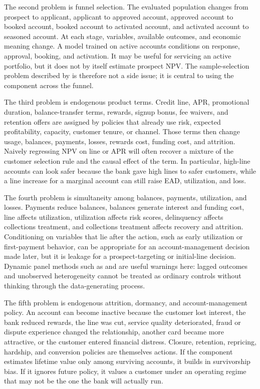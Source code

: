 \documentclass[11pt]{article}
\newcommand{\1}{\mathbf{1}}
\begin{document}
The second problem is funnel selection. The evaluated population changes from
prospect to applicant, applicant to approved account, approved account to
booked account, booked account to activated account, and activated account to
seasoned account. At each stage, variables, available outcomes, and economic
meaning change. A model trained on active accounts conditions on response,
approval, booking, and activation. It may be useful for servicing an active
portfolio, but it does not by itself estimate prospect NPV. The sample-selection
problem described by \citet{heckman1979selection} is therefore not a side
issue; it is central to using the component across the funnel.

The third problem is endogenous product terms. Credit line, APR, promotional
duration, balance-transfer terms, rewards, signup bonus, fee waivers, and
retention offers are assigned by policies that already use risk, expected
profitability, capacity, customer tenure, or channel. Those terms then change
usage, balances, payments, losses, rewards cost, funding cost, and attrition.
Naively regressing NPV on line or APR will often recover a mixture of the
customer selection rule and the causal effect of the term. In particular,
high-line accounts can look safer because the bank gave high lines to safer
customers, while a line increase for a marginal account can still raise EAD,
utilization, and loss.

The fourth problem is simultaneity among balances, payments, utilization, and
losses. Payments reduce balances, balances generate interest and funding cost,
line affects utilization, utilization affects risk scores, delinquency affects
collections treatment, and collections treatment affects recovery and attrition.
Conditioning on variables that lie after the action, such as early utilization
or first-payment behavior, can be appropriate for an account-management
decision made later, but it is leakage for a prospect-targeting or initial-line
decision. Dynamic panel methods such as \citet{arellano1991panel} and
\citet{blundell1998initial} are useful warnings here: lagged outcomes and
unobserved heterogeneity cannot be treated as ordinary controls without
thinking through the data-generating process.

The fifth problem is endogenous attrition, dormancy, and account-management
policy. An account can become inactive because the customer lost interest, the
bank reduced rewards, the line was cut, service quality deteriorated, fraud or
dispute experience changed the relationship, another card became more
attractive, or the customer entered financial distress. Closure, retention,
repricing, hardship, and conversion policies are themselves actions. If the
component estimates lifetime value only among surviving accounts, it builds in
survivorship bias. If it ignores future policy, it values a customer under an
operating regime that may not be the one the bank will actually run.
\end{document}

